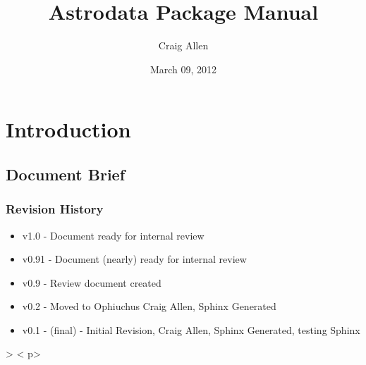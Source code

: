 \documentclass[letterpaper,10pt,english]{sphinxmanual}
\title{Astrodata Package Manual}
\date{March 09, 2012}
\author{Craig Allen}
\begin{document}
\maketitle
\setcounter{tocdepth}{6}
\tableofcontents
{}\label{index::doc}



\chapter{Introduction}
\label{chapter_intro:introduction}\label{chapter_intro:the-astrodata-manual}\label{chapter_intro::doc}

\section{Document Brief}
\label{documentBrief:document-brief}\label{documentBrief::doc}

\subsection{Revision History}
\label{gen.ADMANUAL_RevisionHistory:revision-history}\label{gen.ADMANUAL_RevisionHistory::doc}\begin{itemize}
\item {} 
v1.0 - Document ready for internal review

\item {} 
v0.91 - Document (nearly) ready for internal review

\item {} 
v0.9 - Review document created

\item {} 
v0.2 - Moved to Ophiuchus Craig Allen, Sphinx Generated

\item {} 
v0.1 - (final) - Initial Revision, Craig Allen, Sphinx Generated,
testing Sphinx

\end{itemize}

\textgreater{} \textless{} p\textgreater{}
\end{document}
